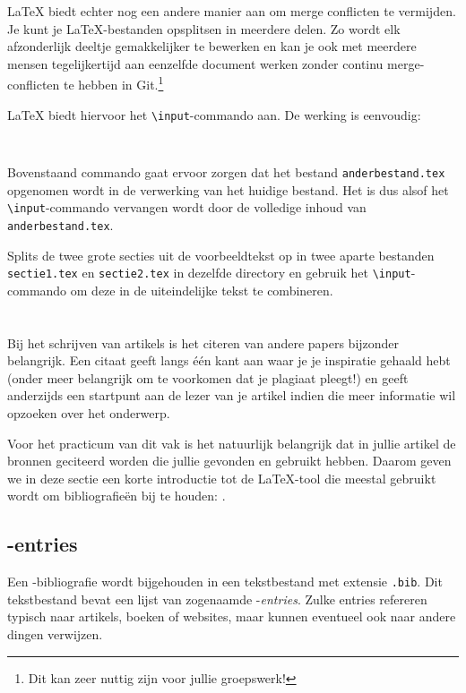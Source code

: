 \documentclass[12pt, dutch]{article}
\newcommand{\bs}{\textbackslash}
\begin{document}
\LaTeX{} biedt echter nog een andere manier aan om merge conflicten te vermijden.
Je kunt je \LaTeX{}-bestanden opsplitsen in meerdere delen. Zo wordt elk
afzonderlijk deeltje gemakkelijker te bewerken en kan je ook met meerdere
mensen tegelijkertijd aan eenzelfde document werken zonder continu
merge-conflicten te hebben in Git.\footnote{Dit kan zeer nuttig zijn voor jullie groepswerk!}

\LaTeX{} biedt hiervoor het \texttt{\bs{}input}-commando aan.
De werking is eenvoudig:
\begin{verbatim}
 
\end{verbatim}
Bovenstaand commando gaat ervoor zorgen dat het bestand
\texttt{anderbestand.tex} opgenomen wordt in de verwerking van het huidige
bestand. Het is dus alsof het \texttt{\bs{}input}-commando
vervangen wordt door de volledige inhoud van \texttt{anderbestand.tex}.

\begin{tcolorbox}[title=Opgave 5j]
  Splits de twee grote secties uit de voorbeeldtekst op in twee aparte
  bestanden \texttt{sectie1.tex} en \texttt{sectie2.tex} in dezelfde directory en gebruik
  het \texttt{\bs{}input}-commando om deze in de uiteindelijke tekst te combineren.
\end{tcolorbox}

\section{\BibTeX}\label{sec:bibtex}

Bij het schrijven van artikels is het citeren van andere papers
bijzonder belangrijk. Een citaat geeft langs \'e\'en kant aan waar je
je inspiratie gehaald hebt (onder meer belangrijk om te voorkomen dat
je plagiaat pleegt!) en geeft anderzijds een startpunt aan de lezer
van je artikel indien die meer informatie wil opzoeken over het
onderwerp.

Voor het practicum van dit vak is het natuurlijk belangrijk dat in
jullie artikel de bronnen geciteerd worden die jullie gevonden en
gebruikt hebben. Daarom geven we in deze sectie een korte introductie
tot de \LaTeX{}-tool die meestal gebruikt wordt om bibliografie\"en
bij te houden: \BibTeX.

\subsection{\BibTeX-entries}

Een \BibTeX-bibliografie wordt bijgehouden in een tekstbestand met
extensie \texttt{.bib}. Dit tekstbestand bevat een lijst van
zogenaamde \BibTeX-\emph{entries}. Zulke entries refereren
typisch naar artikels, boeken of websites, maar kunnen eventueel ook
naar andere dingen verwijzen.
\end{document}
